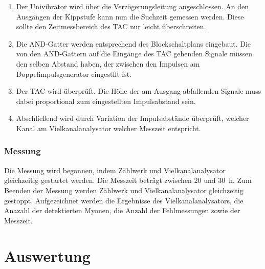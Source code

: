   \begin{enumerate}
    \item Der Univibrator wird über die Verzögerungsleitung angeschlossen. An den
    Ausgängen der Kippstufe kann nun die Suchzeit gemessen werden. Diese sollte den
    Zeitmessbereich des TAC nur leicht überschreiten.
    \item Die AND-Gatter werden entsprechend des Blockschaltplans eingebaut. Die von
    den AND-Gattern auf die Eingänge des TAC gehenden Signale müssen den selben Abstand
    haben, der zwischen den Impulsen am Doppelimpulsgenerator eingestllt ist.
    \item Der TAC wird überprüft. Die Höhe der am Ausgang abfallenden Signale muss
    dabei proportional zum eingestellten Impulsabstand sein.
    \item Abschließend wird durch Variation der Impulsabstände überprüft, welcher Kanal
    am Vielkanalanalysator welcher Messzeit entspricht.
  \end{enumerate}
  \subsubsection{Messung}
  Die Messung wird begonnen, indem Zählwerk und Vielkanalanalysator gleichzeitig
  gestartet werden. Die Messzeit beträgt zwischen 20 und \SI{30}{\hour}.
  Zum Beenden der Messung werden Zählwerk und Vielkanalanalysator gleichzeitig gestoppt.
  Aufgezeichnet werden die Ergebnisse des Vielkanalanalysators, die Anazahl der detektierten
  Myonen, die Anzahl der Fehlmessungen sowie der Messzeit.

\section{Auswertung}

